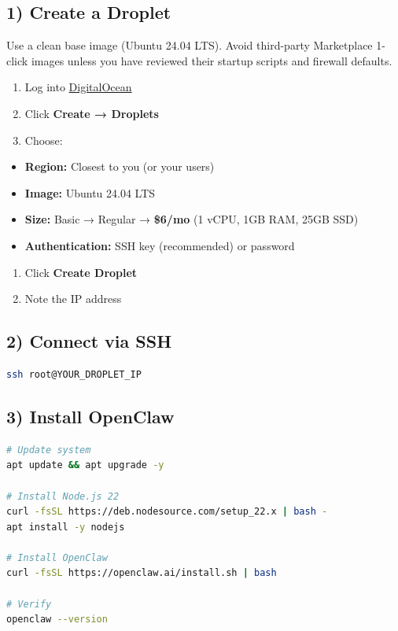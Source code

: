 \subsection{1) Create a Droplet}


Use a clean base image (Ubuntu 24.04 LTS). Avoid third-party Marketplace 1-click images unless you have reviewed their startup scripts and firewall defaults.

\begin{enumerate}
  \item Log into \href{https://cloud.digitalocean.com/}{DigitalOcean}
  \item Click \textbf{Create → Droplets}
  \item Choose:
\end{enumerate}

\begin{itemize}
  \item \textbf{Region:} Closest to you (or your users)
  \item \textbf{Image:} Ubuntu 24.04 LTS
  \item \textbf{Size:} Basic → Regular → \textbf{\$6/mo} (1 vCPU, 1GB RAM, 25GB SSD)
  \item \textbf{Authentication:} SSH key (recommended) or password
\end{itemize}

\begin{enumerate}
  \item Click \textbf{Create Droplet}
  \item Note the IP address
\end{enumerate}


\subsection{2) Connect via SSH}


\begin{lstlisting}[language=bash]
ssh root@YOUR_DROPLET_IP
\end{lstlisting}


\subsection{3) Install OpenClaw}


\begin{lstlisting}[language=bash]
# Update system
apt update && apt upgrade -y

# Install Node.js 22
curl -fsSL https://deb.nodesource.com/setup_22.x | bash -
apt install -y nodejs

# Install OpenClaw
curl -fsSL https://openclaw.ai/install.sh | bash

# Verify
openclaw --version
\end{lstlisting}


